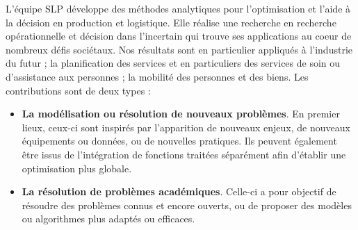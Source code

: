 L'équipe SLP développe des méthodes analytiques pour l'optimisation et l'aide à la décision en production et logistique. 
Elle réalise une recherche en recherche opérationnelle et décision dans l'incertain qui trouve ses applications au coeur de nombreux défis sociétaux.
Nos résultats sont en particulier appliqués à l'industrie du futur ; la planification des services et en particuliers des services de soin ou d'assistance aux personnes ; la mobilité des personnes et des biens.
Les contributions sont de deux types : 
\begin{itemize}
\item \textbf{La modélisation ou résolution de nouveaux problèmes}. En premier lieux, ceux-ci sont  inspirés par l'apparition de nouveaux enjeux, de nouveaux équipements ou données, ou de nouvelles pratiques. 
Ils peuvent également être issus de l'intégration de fonctions traitées séparément afin d'établir une optimisation plus globale. 
\item \textbf{La résolution de problèmes académiques}. Celle-ci a pour objectif de résoudre des problèmes connus et encore ouverts, ou de proposer des modèles ou algorithmes plus adaptés ou efficaces.
\end{itemize}

